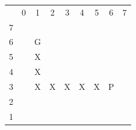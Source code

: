 \documentclass[11pt]{exam}
\begin{document}
\begin{table}[H]
	\centering
	\begin{tabular}{ccccccccc}
		&
		0 &
		1 &
		2 &
		3 &
		4 &
		5 &
		6 &
		7 \\ \cline{2-9} 
		\multicolumn{1}{c|}{7} &
		\multicolumn{1}{c|}{\cellcolor[HTML]{000000}} &
		\multicolumn{1}{c|}{\cellcolor[HTML]{000000}} &
		\multicolumn{1}{c|}{\cellcolor[HTML]{000000}} &
		\multicolumn{1}{c|}{\cellcolor[HTML]{000000}} &
		\multicolumn{1}{c|}{\cellcolor[HTML]{000000}} &
		\multicolumn{1}{c|}{\cellcolor[HTML]{000000}} &
		\multicolumn{1}{c|}{\cellcolor[HTML]{000000}} &
		\multicolumn{1}{c|}{\cellcolor[HTML]{000000}} \\ \cline{2-9} 
		\multicolumn{1}{c|}{6} &
		\multicolumn{1}{c|}{\cellcolor[HTML]{000000}} &
		\multicolumn{1}{c|}{G} &
		\multicolumn{1}{c|}{} &
		\multicolumn{1}{c|}{} &
		\multicolumn{1}{c|}{} &
		\multicolumn{1}{c|}{} &
		\multicolumn{1}{c|}{} &
		\multicolumn{1}{c|}{\cellcolor[HTML]{000000}} \\ \cline{2-9} 
		\multicolumn{1}{c|}{5} &
		\multicolumn{1}{c|}{\cellcolor[HTML]{000000}} &
		\multicolumn{1}{c|}{X} &
		\multicolumn{1}{c|}{} &
		\multicolumn{1}{c|}{} &
		\multicolumn{1}{c|}{} &
		\multicolumn{1}{c|}{} &
		\multicolumn{1}{c|}{} &
		\multicolumn{1}{c|}{\cellcolor[HTML]{000000}} \\ \cline{2-9} 
		\multicolumn{1}{c|}{4} &
		\multicolumn{1}{c|}{\cellcolor[HTML]{000000}} &
		\multicolumn{1}{c|}{X} &
		\multicolumn{1}{c|}{} &
		\multicolumn{1}{c|}{} &
		\multicolumn{1}{c|}{} &
		\multicolumn{1}{c|}{} &
		\multicolumn{1}{c|}{} &
		\multicolumn{1}{c|}{\cellcolor[HTML]{000000}} \\ \cline{2-9} 
		\multicolumn{1}{c|}{3} &
		\multicolumn{1}{c|}{\cellcolor[HTML]{000000}} &
		\multicolumn{1}{c|}{X} &
		\multicolumn{1}{c|}{X} &
		\multicolumn{1}{c|}{X} &
		\multicolumn{1}{c|}{X} &
		\multicolumn{1}{c|}{X} &
		\multicolumn{1}{c|}{P} &
		\multicolumn{1}{c|}{\cellcolor[HTML]{000000}} \\ \cline{2-9} 
		\multicolumn{1}{c|}{2} &
		\multicolumn{1}{c|}{\cellcolor[HTML]{000000}} &
		\multicolumn{1}{c|}{} &
		\multicolumn{1}{c|}{} &
		\multicolumn{1}{c|}{} &
		\multicolumn{1}{c|}{} &
		\multicolumn{1}{c|}{} &
		\multicolumn{1}{c|}{} &
		\multicolumn{1}{c|}{\cellcolor[HTML]{000000}} \\ \cline{2-9} 
		\multicolumn{1}{c|}{1} &
		\multicolumn{1}{c|}{\cellcolor[HTML]{000000}} &
		\multicolumn{1}{c|}{} &
		\multicolumn{1}{c|}{} &
		\multicolumn{1}{c|}{} &
		\multicolumn{1}{c|}{} &
		\multicolumn{1}{c|}{} &

\end{tabular}
\end{table}
\end{document}
